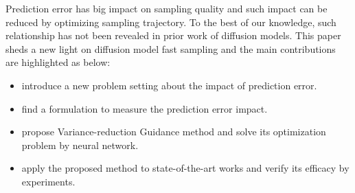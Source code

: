 Prediction error has big impact on sampling quality and such impact can be reduced by optimizing sampling trajectory. 
To the best of our knowledge, such relationship has not been revealed in prior work of diffusion models.
This paper sheds a new light on diffusion model fast sampling and the main contributions are highlighted as below:

\begin{itemize}
 \item introduce a new problem setting about the impact of prediction error.
 \item find a formulation to measure the prediction error impact.
 \item propose Variance-reduction Guidance method and solve its optimization problem by neural network.
 \item apply the proposed method to state-of-the-art works and verify its efficacy by experiments.
\end{itemize}
 





